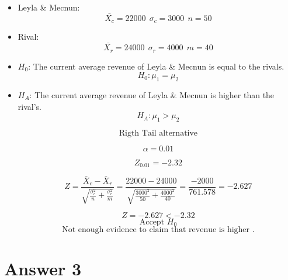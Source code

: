 \documentclass[12pt]{article}
\begin{document}
\begin{itemize}

    \item[] Leyla \& Mecnun:  
    \[ \bar{X_c} = 22000 \ \ \sigma_c = 3000 \ \ n = 50 \]
    
    \item[] Rival:
    \[ \bar{X_r} = 24000 \ \ \sigma_r = 4000 \ \ m = 40 \]

    \item[] \(H_0\): The current average revenue of Leyla \& Mecnun is equal to the rivals.
    \[ H_0: \mu_1 = \mu_2 \]

    \item[] \(H_A\): The current average revenue of Leyla \& Mecnun is higher than the rival's.
    \[ H_A: \mu_1 > \mu_2 \]

    \[ \text{Rigth Tail alternative}\]

    \[ \alpha = 0.01 \]

    \[ Z_{0.01} = -2.32 \]
    
    \[ Z = \frac{\bar{X}_c - \bar{X}_r}{\sqrt{\frac{\sigma_c^2}{n} + \frac{\sigma_r^2}{m}}} = \frac{22000 - 24000}{\sqrt{\frac{3000^2}{50} + \frac{4000^2}{40}}} = \frac{-2000}{761.578} = -2.627 \]

    
    \[ Z = -2.627 < -2.32 \]
    \[ \text{Accept } H_0 \]
    \[ \text{Not enough evidence to claim that revenue is higher .}\]
    
\end{itemize}




\section*{Answer 3}
\end{document}
